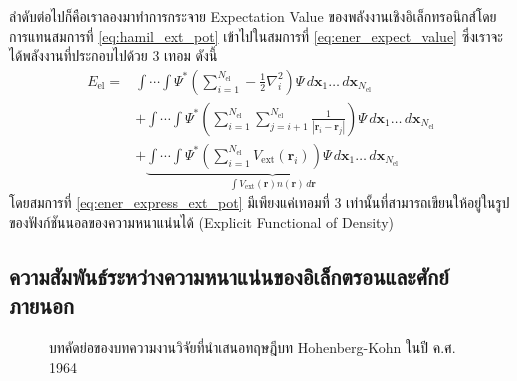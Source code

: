 ลำดับต่อไปก็คือเราลองมาทำการกระจาย Expectation Value ของพลังงานเชิงอิเล็กทรอนิกส์โดยการแทนสมการที่ \eqref{eq:hamil_ext_pot} เข้าไปในสมการที่ \eqref{eq:ener_expect_value} ซึ่งเราจะได้พลังงานที่ประกอบไปด้วย 3 เทอม ดังนี้
%
\begin{align}\label{eq:ener_express_ext_pot}
    E_{\text{el}} = & \int \cdots \int \Psi^{\ast}
    \left ( \sum^{N_{\text{el}}}_{i=1} -\frac{1}{2} \nabla^{2}_{i} \right )
    \Psi \, d\bm{x}_{1} \dots \, d\bm{x}_{N_{\text{el}}} \nonumber \\
                    & + \int \cdots \int \Psi^{\ast}
    \left ( \sum^{N_{\text{el}}}_{i=1} \sum^{N_{\text{el}}}_{j=i+1} \frac{1}{|\bm{r}_{i}-\bm{r}_{j}|} \right )
    \Psi \, d\bm{x}_{1} \dots \, d\bm{x}_{N_{\text{el}}} \nonumber \\
                    & + \underbrace{\int \cdots \int \Psi^{\ast}
    \left ( \sum^{N_{\text{el}}}_{i=1} V_{\text{ext}}(\bm{r}_{i}) \right )
    \Psi \, d\bm{x}_{1} \dots \, d\bm{x}_{N_{\text{el}}}    }_{\textstyle \int V_{\text{ext}}(\bm{r}) n(\bm{r}) \, d\bm{r}}
\end{align}
%
\noindent โดยสมการที่ \eqref{eq:ener_express_ext_pot} มีเพียงแค่เทอมที่ 3 เท่านั้นที่สามารถเขียนให้อยู่ในรูปของฟังก์ชันนอลของความหนาแน่นได้ (Explicit Functional of Density)

\subsection{ความสัมพันธ์ระหว่างความหนาแน่นของอิเล็กตรอนและศักย์ภายนอก}
\label{ssec:ener_density_ext_pot}

\begin{figure}[H]
    \centering
    \caption{บทคัดย่อของบทความงานวิจัยที่นำเสนอทฤษฎีบท Hohenberg-Kohn ในปี ค.ศ. 1964}
    \label{fig:hohenberg_kohn_abs}
\end{figure}

